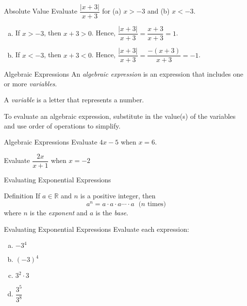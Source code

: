 \documentclass{beamer}
\def\R{\mathbb{R}} %
\newcommand{\fp}[1]{\left({#1}\right)} %
\newcommand{\av}[1]{\left|{#1}\right|} %
\begin{document}
\begin{frame}[t]{Absolute Value}
Evaluate $\dfrac{\av{x+3}}{x+3}$ for (a) $x > -3$ and (b) $x < -3$.

\begin{enumerate}[(a)]
\item<2-> If $x > -3$, then $x + 3 > 0$. Hence, $\dfrac{\av{x+3}}{x+3} = \dfrac{x+3}{x+3} = 1$.
\item<3> If $x < -3$, then $x + 3 < 0$. Hence, $\dfrac{\av{x+3}}{x+3} = \dfrac{-\fp{x+3}}{x+3} = -1$.
\end{enumerate}
\end{frame}

\begin{frame}[t]{Algebraic Expressions}
An \textit{algebraic expression} is an expression that includes one or more \textit{variables}.

A \textit{variable} is a letter that represents a number.

To evaluate an algebraic expression, substitute in the value(s) of the variables and use order of operations to simplify.
\end{frame}

\begin{frame}[t]{Algebraic Expressions}
Evaluate $4x - 5$ when $x = 6$. \vspace{-6pt}

\vfill


Evaluate $\dfrac{2x}{x+1}$ when $x = -2$
\end{frame}

\begin{frame}[t]{Evaluating Exponential Expressions}
\begin{block}{Definition}
If $a \in \R$ and $n$ is a positive integer, then $$a^n = a\cdot a \cdot a \cdots \cdot a \; \text{ ($n$ times)}$$ where $n$ is the \textit{exponent} and $a$ is the \textit{base}.
\end{block}
\end{frame}

\begin{frame}[t]{Evaluating Exponential Expressions}
Evaluate each expression: \begin{enumerate}[(a)]
\item $-3^4$
\item $(-3)^4$
\item $3^2\cdot 3$
\item $\dfrac{3^5}{3^8}$
\end{enumerate}

\end{frame}
\end{document}
